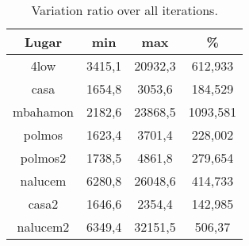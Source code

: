 \begin{table}[ht]
\caption[Page Benchmark Test: Variation ratio over all]{Variation ratio over all iterations.}
\begin{center}
\begin{tabular}{|c||c|c|c|}
\hline
Lugar & min & max & \% \\ \hline \hline
4low & 3415,1 & 20932,3 & 612,933 \\ \hline
casa & 1654,8 & 3053,6 & 184,529 \\ \hline
mbahamon & 2182,6 & 23868,5 & 1093,581 \\ \hline
polmos & 1623,4 & 3701,4 & 228,002 \\ \hline
polmos2 & 1738,5 & 4861,8 & 279,654 \\ \hline
nalucem & 6280,8 & 26048,6 & 414,733 \\ \hline
casa2 & 1646,6 & 2354,4 & 142,985 \\ \hline
nalucem2 & 6349,4 & 32151,5 & 506,37 \\ \hline
\end{tabular}
\end{center}
\label{table:variationnet}
\end{table}